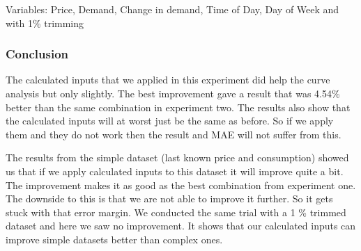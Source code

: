 \noindent Variables: Price, Demand, Change in demand, Time of Day, Day of Week and with 1\% trimming
\begin{table}[H]
\centering  %
\caption{Scatter text~\cite{singhal2011electricity} with other calculated inputs and 1\% trim} %
\label{table:scatter_text_1p_trim} %
\end{table}

\subsubsection{Conclusion}
The calculated inputs that we applied in this experiment did help the curve analysis but only slightly. The best improvement gave a result that was 4.54\% better than the same combination in experiment two. The results also show that the calculated inputs will at worst just be the same as before. So if we apply them and they do not work then the result and MAE will not suffer from this.

The results from the simple dataset (last known price and consumption) showed us that if we apply calculated inputs to this dataset it will improve quite a bit. The improvement makes it as good as the best combination from experiment one. The downside to this is that we are not able to improve it further. So it gets stuck with that error margin. We conducted the same trial with a 1 \% trimmed dataset and here we saw no improvement. It shows that our calculated inputs can improve simple datasets better than complex ones.

